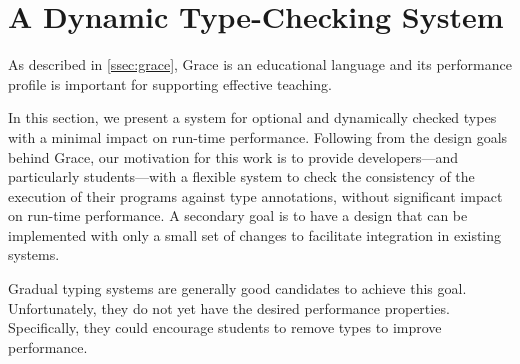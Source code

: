 
\section{A Dynamic Type-Checking System}
\label{sec:method}




As described in \cref{ssec:grace},
Grace is an educational language and its performance profile
is important for supporting effective teaching. 

In this section,
we present a system for optional and dynamically checked types
with a minimal impact on run-time performance.
Following from the design goals behind Grace,
our motivation for this work
is to provide developers---and particularly students---with a flexible system 
to check the consistency of the execution of their programs
against type annotations,
without significant impact on run-time performance.
A secondary goal is to have a design that can be implemented with
only a small set of changes to facilitate integration in existing systems.

Gradual typing systems are generally good candidates to achieve this goal.
Unfortunately, they do not yet have the desired performance properties\citep{Takikawa2016,Vitousek2017,Muehlboeck2017,Bauman2017,Richards2017,Greenman2018}.
Specifically, they could encourage students to remove types
to improve performance.



